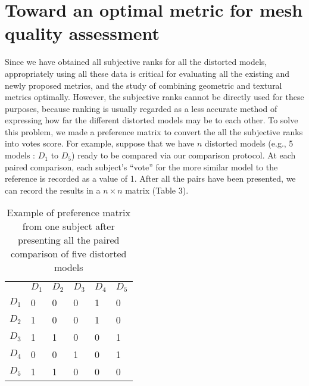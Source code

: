 \section{Toward an optimal metric for mesh quality assessment}
Since we have obtained all subjective ranks for all the distorted models, appropriately using all these data is critical for evaluating all the existing and newly proposed metrics, and the study of combining geometric and textural metrics optimally. However, the subjective ranks cannot be directly used for these purposes, because ranking is usually regarded as a less accurate method of expressing how far the different distorted models may be to each other.  To solve this problem, we made a preference matrix \cite{Ledda_2005} to convert the all the subjective ranks into votes score. For example, suppose that we have $n$ distorted models (e.g., 5 models : $D_1$ to $D_5$) ready to be compared via our comparison protocol.   At each paired comparison, each subject’s “vote” for the more similar model to the reference is recorded as a value of 1. After all the pairs have been presented, we can record the results in a $n \times n$ matrix (Table 3).
\begin{table}[]
\centering
\caption{Example of preference matrix from one subject after presenting all the paired comparison of five distorted models }
\label{my-label}
\begin{tabular}{llllll}
            & $D_1$ & $D_2$ & $D_3$ & $D_4$ & $D_5$ \\
$D_1$ & 0           & 0           & 0           & 1           & 0           \\
$D_2$ & 1           & 0           & 0           & 1           & 0           \\
$D_3$ & 1           & 1           & 0           & 0           & 1           \\
$D_4$ & 0           & 0           & 1           & 0           & 1           \\
$D_5$ & 1           & 1           & 0           & 0           & 0          
\end{tabular}
\end{table}

